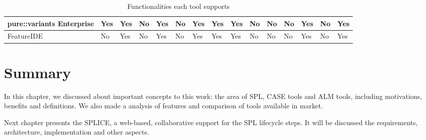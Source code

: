 \begin{landscape}
\begin{table}[!ht]
\begin{center}
\begin{tabular}{|l|l|l|l|l|l|l|l|l|l|l|l|l|l|l|}
    pure::variants Enterprise & Yes             & Yes          & No             & Yes                         & No             & Yes     & Yes            & Yes          & No                      & No                          & No        & Yes                & No          & Yes          \\ \hline
    FeatureIDE & No             & Yes          & No             & Yes                         & No             & Yes     & Yes            & Yes          & No                      & No                          & No        & Yes                & No          & Yes          \\ \hline
    \end{tabular}
        \caption{Functionalities each tool supports}
        \label{table:functionalitiestools}
        \end{center}
\end{table}
\end{landscape}

\section{Summary}
\label{sc:summary}
In this chapter, we discussed about important concepts to this work: the area of \acf{SPL}, \acf{CASE} tools and \acf{ALM} tools, including motivations, benefits and definitions. We also made a analysis of features and comparison of tools available in market.

Next chapter presents the \acf{SPLICE}, a web-based, collaborative support for the \ac{SPL} lifecycle steps. It will be discussed the requirements, architecture, implementation and other aspects.

